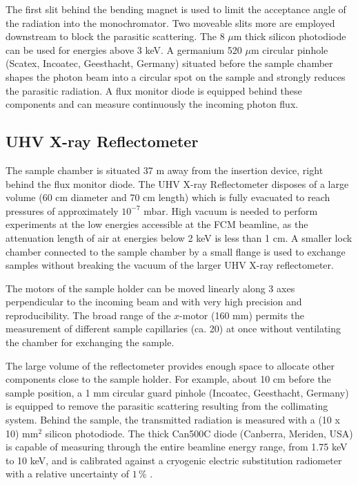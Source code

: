 The first slit behind the bending magnet is used to limit the acceptance angle of the radiation into the monochromator. Two moveable slits more are employed downstream to block the parasitic scattering. The 8 $\mu$m thick silicon photodiode can be used for energies above 3 keV. A germanium 520 $\mu$m circular pinhole (Scatex, Incoatec, Geesthacht, Germany) situated before the sample chamber shapes the photon beam into a circular spot on the sample and strongly reduces the parasitic radiation. A flux monitor diode is equipped behind these components and can measure continuously the incoming photon flux.

\subsection{UHV X-ray Reflectometer}

The sample chamber is situated 37 m away from the insertion device, right behind the flux monitor diode. The UHV X-ray Reflectometer disposes of a large volume (60 cm diameter and 70 cm length) which is fully evacuated to reach pressures of approximately $10^{-7}$ mbar. High vacuum is needed to perform experiments at the low energies accessible at the FCM beamline, as the attenuation length of air at energies below 2 keV is less than 1 cm. A smaller lock chamber connected to the sample chamber by a small flange is used to exchange samples without breaking the vacuum of the larger UHV X-ray reflectometer.

The motors of the sample holder can be moved linearly along 3 axes perpendicular to the incoming beam and with very high precision and reproducibility. The broad range of the $x$-motor (160 mm) permits the measurement of different sample capillaries (ca. 20) at once without ventilating the chamber for exchanging the sample.

The large volume of the reflectometer provides enough space to allocate other components close to the sample holder. For example, about 10 cm before the sample position, a 1 mm circular guard pinhole (Incoatec, Geesthacht, Germany) is equipped to remove the parasitic scattering resulting from the collimating system. Behind the sample, the transmitted radiation is measured with a (10 x 10) mm$^2$ silicon photodiode. The thick Can500C diode (Canberra, Meriden, USA) is capable of measuring through the entire beamline energy range, from 1.75 keV to 10 keV, and is calibrated against a cryogenic electric substitution radiometer with a relative uncertainty of \( 1\,\% \) \cite{krumrey_high-accuracy_2001}.

